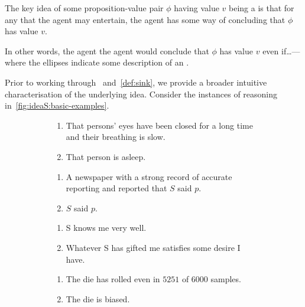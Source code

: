 \begin{note}
  The key idea of some proposition-value pair \(\phi\) having value \(v\) being a \sink{} is that for any \epPAd{} \world{} that the agent may entertain, the agent has some way of concluding that \(\phi\) has value \(v\).

  In other words, the agent the agent would conclude that \(\phi\) has value \(v\) even if\dots\space --- where the ellipses indicate some description of an \epPAd{} \world{}.
\end{note}

\begin{note}
  Prior to working through~\ideaS{} and~\autoref{def:sink}, we provide a broader intuitive characterisation of the underlying idea.
  Consider the instances of reasoning in~\autoref{fig:ideaS:basic-examples}.

    \begin{figure}[h!]
    \mbox{}\hfill
    \begin{subfigure}{0.45\linewidth}
      \begin{enumerate}
      \item That persons' eyes have been closed for a long time and their breathing is slow.
      \item That person is asleep.
      \end{enumerate}
      \caption{}
    \end{subfigure}
    \hfill
    \begin{subfigure}{0.45\linewidth}
      \begin{enumerate}
      \item A newspaper with a strong record of accurate reporting and reported that \(S\) said \(p\).
      \item \(S\) said \(p\).
      \end{enumerate}
      \caption{}
    \end{subfigure}
    \hfill\mbox{}

    \mbox{}\hfill
    \begin{subfigure}{0.45\linewidth}
      \begin{enumerate}
      \item S knows me very well.
      \item Whatever S has gifted me satisfies some desire I have.
      \end{enumerate}
      \caption{}
    \end{subfigure}
    \hfill
    \begin{subfigure}{0.45\linewidth}
      \begin{enumerate}
      \item The die has rolled even in \(5251\) of \(6000\) samples.
      \item The die is biased.
      \end{enumerate}
      \caption{}
    \end{subfigure}
    \hfill\mbox{}
    \caption{}
    \label{fig:ideaS:basic-examples}
  \end{figure}


\end{note}
